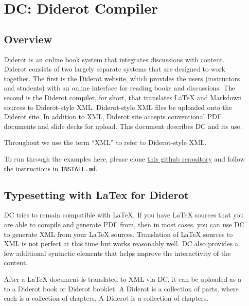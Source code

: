\chapter{DC: Diderot Compiler}
\label{mtl}
 

\section{Overview}
Diderot is an online book system that integrates discussions with
content.  Diderot consists of two largely separate systems that are
designed to work together.  The first is the Diderot website, which
provides the users (instructors and students) with an online interface
for reading books and discussions.  The second is the Diderot
compiler,  for short, that translates LaTeX and Markdown
sources to Diderot-style XML.
%
Diderot-style XML files be uploaded onto the Diderot site. 
%
In addition to XML, Diderot site accepts conventional PDF documents
and slide decks for upload.  This document describes DC and its use.

\begin{note}
Throughout we use the term ``XML'' to refer to Diderot-style XML.
\end{note}


\begin{important}
To run through the examples here, please clone 
%
\href{https://github.com/diderot-edu/guide}{this github repository}
%
and follow the instructions in \lstinline`INSTALL.md`. 
\end{important}

\section{Typesetting with LaTex for Diderot}

DC tries to remain compatible with LaTeX.   If you have  LaTeX sources that you are able to compile and generate PDF from, then in most cases, you can use DC to generate XML from your LaTeX sources.  Translation of LaTeX sources to XML is not perfect at this time but works reasonably well. DC also provides a few additional syntactic elements that helps improve the interactivity of the content.  

\begin{definition}
After a LaTeX document is translated to XML via DC, it can be uploaded as a  to a Diderot book or Diderot booklet.  
%
A Diderot  is a collection of parts, where each  is a collection of chapters.
%
A Diderot  is a collection of chapters. 
\end{definition}

